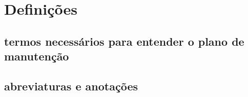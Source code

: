 \chapter{Definições}

\section{termos necessários para entender o plano de manutenção}

\section{abreviaturas e anotações}